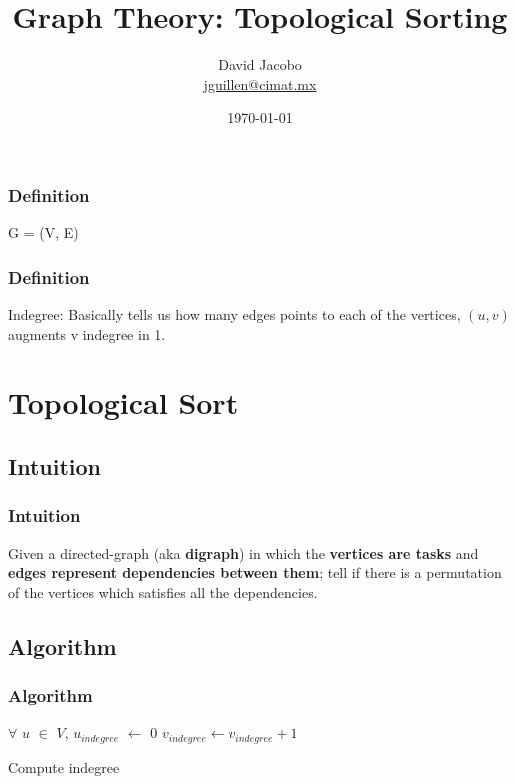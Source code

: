 \documentclass[article]{beamer}
\title{Graph Theory: Topological Sorting}
\author{David Jacobo \\ \href{mailto:jguillen@cimat.mx}{jguillen@cimat.mx}}
\date{\scriptsize{\today}}
\begin{document}
\maketitle			
			
\begin{frame}
\frametitle{Definition}
\begin{center}
\huge
	G = (V, E)
	
\vspace{8mm}	
	
\end{center}
\end{frame}

\begin{frame}
\frametitle{Definition}
\begin{center}
Indegree: Basically tells us how many edges points to each of the vertices, $(u,v)$ augments v indegree in 1.
\end{center}
\end{frame}


\section{Topological Sort}
\subsection{Intuition}
\begin{frame}
	\frametitle{Intuition}
	
	Given a directed-graph (aka \textbf{digraph}) in which the \textbf{vertices are tasks} and \textbf{edges represent dependencies between them}; tell if there is a permutation of the vertices which satisfies all the dependencies.

\end{frame}

\subsection{Algorithm}
\begin{frame}
	\frametitle{Algorithm}
	
		\begin{algorithm}[H]
		\begin{algorithmic}[1]
		\STATE $\forall$ $u$ $\in$ $V$, $u_{indegree}$ $\gets$ 0		
		\STATE $v_{indegree} \gets v_{indegree} + 1$
		\ENDIF
		\ENDFOR
		\ENDFOR		
		
		\end{algorithmic}
		\caption{Compute indegree}
		\label{alg:seq}
		\end{algorithm}	
	
\end{frame}
\end{document}
